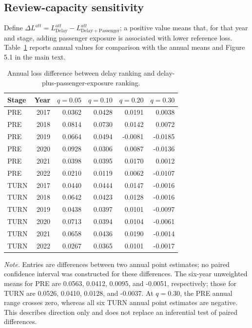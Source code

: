 \documentclass[10pt,a4paper]{article}
\numberwithin{equation}{section}
\begin{document}
\subsection{Review-capacity sensitivity}
Define $\Delta L^{att}=L^{att}_{\mathrm{Delay}}-L^{att}_{\mathrm{Delay+Passenger}}$; a positive value means that, for that year and stage, adding passenger exposure is associated with lower reference loss. Table~\ref{tab:s4} reports annual values for comparison with the annual means and Figure 5.1 in the main text.

\small
\begin{longtable}{l r r r r r}
\caption{Annual loss difference between delay ranking and delay-plus-passenger-exposure ranking.}\label{tab:s4}\\
\toprule
Stage & Year & $q=0.05$ & $q=0.10$ & $q=0.20$ & $q=0.30$ \\
\midrule
PRE & 2017 & 0.0362 & 0.0428 & 0.0191 & 0.0038 \\
PRE & 2018 & 0.0814 & 0.0730 & 0.0142 & 0.0072 \\
PRE & 2019 & 0.0664 & 0.0494 & -0.0081 & -0.0185 \\
PRE & 2020 & 0.0928 & 0.0306 & 0.0087 & -0.0136 \\
PRE & 2021 & 0.0398 & 0.0395 & 0.0170 & 0.0012 \\
PRE & 2022 & 0.0210 & 0.0119 & 0.0062 & -0.0107 \\
TURN & 2017 & 0.0440 & 0.0444 & 0.0147 & -0.0016 \\
TURN & 2018 & 0.0642 & 0.0423 & 0.0128 & -0.0016 \\
TURN & 2019 & 0.0438 & 0.0397 & 0.0101 & -0.0097 \\
TURN & 2020 & 0.0713 & 0.0394 & 0.0104 & -0.0061 \\
TURN & 2021 & 0.0658 & 0.0436 & 0.0190 & -0.0014 \\
TURN & 2022 & 0.0267 & 0.0365 & 0.0101 & -0.0017 \\
\bottomrule
\end{longtable}
\normalsize
\noindent\textit{Note.} Entries are differences between two annual point estimates; no paired confidence interval was constructed for these differences. The six-year unweighted means for PRE are 0.0563, 0.0412, 0.0095, and -0.0051, respectively; those for TURN are 0.0526, 0.0410, 0.0128, and -0.0037. At $q=0.30$, the PRE annual range crosses zero, whereas all six TURN annual point estimates are negative. This describes direction only and does not replace an inferential test of paired differences.
\end{document}
